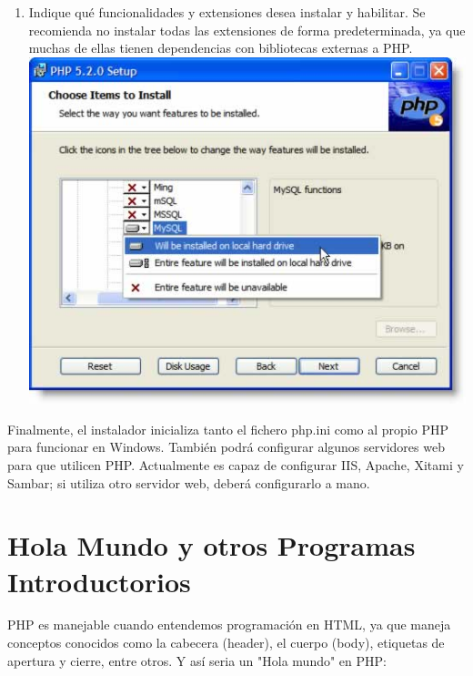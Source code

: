 \documentclass[11pt]{article} %
\begin{document}
\begin{enumerate}
\item Indique qué funcionalidades y extensiones desea instalar y habilitar. Se recomienda no instalar todas las extensiones de forma predeterminada, ya que muchas de ellas tienen dependencias con bibliotecas externas a PHP.\\
\includegraphics{Imagenes/install03.jpg}
\end{enumerate}

Finalmente, el instalador inicializa tanto el fichero php.ini como al propio PHP para funcionar en Windows. También podrá configurar algunos servidores web para que utilicen PHP. Actualmente es capaz de configurar IIS, Apache, Xitami y Sambar; si utiliza otro servidor web, deberá configurarlo a mano.

\section{Hola Mundo y otros Programas Introductorios}
PHP es manejable cuando entendemos programación en HTML, ya que maneja conceptos conocidos como la cabecera (header), el cuerpo (body), etiquetas de apertura y cierre, entre otros. Y así seria un "Hola mundo" en PHP:
\end{document}
